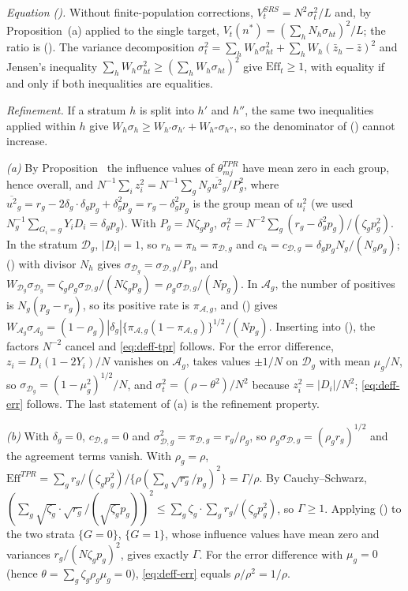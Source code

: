 \emph{Equation ().} Without finite-population corrections,
$V^{SRS}_t=N^2\sigma^2_t/L$ and, by Proposition~(a) applied to the single
target, $V_t(n^\ast)=(\sum_hN_h\sigma_{ht})^2/L$; the ratio is (). The variance
decomposition $\sigma_t^2=\sum_hW_h\sigma_{ht}^2+\sum_hW_h(\bar z_h-\bar z)^2$ and Jensen's inequality
$\sum_hW_h\sigma_{ht}^2\ge(\sum_hW_h\sigma_{ht})^2$ give $\mathrm{Eff}_t\ge1$, with equality if and
only if both inequalities are equalities.

\emph{Refinement.} If a stratum $h$ is split into $h'$ and $h''$, the same two inequalities
applied within $h$ give $W_h\sigma_h\ge W_{h'}\sigma_{h'}+W_{h''}\sigma_{h''}$, so the denominator of
() cannot increase.

\emph{(a)} By Proposition~ the influence values of $\theta^{TPR}_{mj}$ have mean
zero in each group, hence overall, and $N^{-1}\sum_iz_i^2=N^{-1}\sum_gN_g\overline{u^2}_g/P_g^2$,
where $\overline{u^2}_g=r_g-2\delta_g\cdot\delta_gp_g+\delta_g^2p_g=r_g-\delta_g^2p_g$ is the group mean
of $u_i^2$ (we used $N_g^{-1}\sum_{G_i=g}Y_iD_i=\delta_gp_g$). With $P_g=N\zeta_gp_g$,
$\sigma_t^2=N^{-2}\sum_g(r_g-\delta_g^2p_g)/(\zeta_gp_g^2)$. In the stratum $\mathcal D_g$,
$|D_i|=1$, so $r_h=\pi_h=\pi_{\mathcal D,g}$ and $c_h=c_{\mathcal D,g}=\delta_gp_gN_g/(N_g\rho_g)$;
() with divisor $N_h$ gives $\sigma_{\mathcal D_g}=\sigma_{\mathcal D,g}/P_g$, and
$W_{\mathcal D_g}\sigma_{\mathcal D_g}=\zeta_g\rho_g\sigma_{\mathcal D,g}/(N\zeta_gp_g)=
\rho_g\sigma_{\mathcal D,g}/(Np_g)$. In $\mathcal A_g$, the number of positives is
$N_g(p_g-r_g)$, so its positive rate is $\pi_{\mathcal A,g}$, and () gives
$W_{\mathcal A_g}\sigma_{\mathcal A_g}=(1-\rho_g)|\delta_g|\{\pi_{\mathcal A,g}(1-\pi_{\mathcal A,g})\}^{1/2}/(Np_g)$.
Inserting into (), the factors $N^{-2}$ cancel and \eqref{eq:deff-tpr} follows.
For the error difference, $z_i=D_i(1-2Y_i)/N$ vanishes on $\mathcal A_g$, takes values $\pm1/N$ on
$\mathcal D_g$ with mean $\mu_g/N$, so $\sigma_{\mathcal D_g}=(1-\mu_g^2)^{1/2}/N$, and
$\sigma_t^2=(\rho-\theta^2)/N^2$ because $z_i^2=|D_i|/N^2$; \eqref{eq:deff-err} follows. The last
statement of (a) is the refinement property.

\emph{(b)} With $\delta_g=0$, $c_{\mathcal D,g}=0$ and $\sigma^2_{\mathcal D,g}=\pi_{\mathcal D,g}=r_g/\rho_g$,
so $\rho_g\sigma_{\mathcal D,g}=(\rho_gr_g)^{1/2}$ and the agreement terms vanish. With $\rho_g=\rho$,
$\mathrm{Eff}^{TPR}=\sum_gr_g/(\zeta_gp_g^2)\big/\{\rho(\sum_g\sqrt{r_g}/p_g)^2\}=\Gamma/\rho$. By
Cauchy--Schwarz, $(\sum_g\sqrt{\zeta_g}\cdot\sqrt{r_g}/(\sqrt{\zeta_g}p_g))^2\le\sum_g\zeta_g\cdot
\sum_gr_g/(\zeta_gp_g^2)$, so $\Gamma\ge1$. Applying () to the two strata
$\{G=0\}$, $\{G=1\}$, whose influence values have mean zero and variances $r_g/(N\zeta_gp_g)^2$, gives
exactly $\Gamma$. For the error difference with $\mu_g=0$ (hence $\theta=\sum_g\zeta_g\rho_g\mu_g=0$),
\eqref{eq:deff-err} equals $\rho/\rho^2=1/\rho$.

